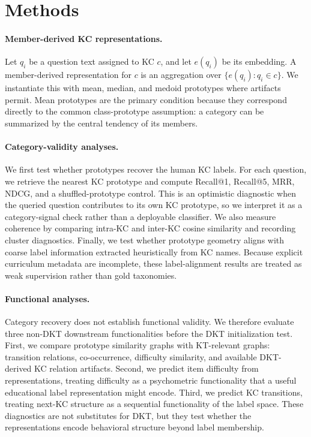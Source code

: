 \section{Methods}
\paragraph{Member-derived KC representations.}
Let $q_i$ be a question text assigned to KC $c$, and let $e(q_i)$ be its embedding. A member-derived representation for $c$ is an aggregation over $\{e(q_i): q_i \in c\}$. We instantiate this with mean, median, and medoid prototypes where artifacts permit. Mean prototypes are the primary condition because they correspond directly to the common class-prototype assumption: a category can be summarized by the central tendency of its members.

\paragraph{Category-validity analyses.}
We first test whether prototypes recover the human KC labels. For each question, we retrieve the nearest KC prototype and compute Recall@1, Recall@5, MRR, NDCG, and a shuffled-prototype control. This is an optimistic diagnostic when the queried question contributes to its own KC prototype, so we interpret it as a category-signal check rather than a deployable classifier. We also measure coherence by comparing intra-KC and inter-KC cosine similarity and recording cluster diagnostics. Finally, we test whether prototype geometry aligns with coarse label information extracted heuristically from KC names. Because explicit curriculum metadata are incomplete, these label-alignment results are treated as weak supervision rather than gold taxonomies.

\paragraph{Functional analyses.}
Category recovery does not establish functional validity. We therefore evaluate three non-DKT downstream functionalities before the DKT initialization test. First, we compare prototype similarity graphs with KT-relevant graphs: transition relations, co-occurrence, difficulty similarity, and available DKT-derived KC relation artifacts. Second, we predict item difficulty from representations, treating difficulty as a psychometric functionality that a useful educational label representation might encode. Third, we predict KC transitions, treating next-KC structure as a sequential functionality of the label space. These diagnostics are not substitutes for DKT, but they test whether the representations encode behavioral structure beyond label membership.

